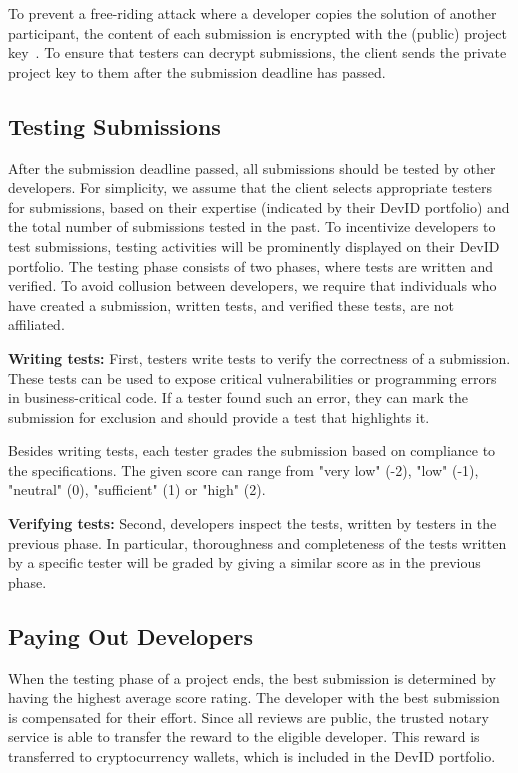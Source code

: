 To prevent a free-riding attack where a developer copies the solution of another participant, the content of each submission is encrypted with the (public) project key~\cite{zhang2015keep}.
To ensure that testers can decrypt submissions, the client sends the private project key to them after the submission deadline has passed.

\subsection{Testing Submissions}
\label{subsec:review_submissions}
After the submission deadline passed, all submissions should be tested by other developers.
For simplicity, we assume that the client selects appropriate testers for submissions, based on their expertise (indicated by their DevID portfolio) and the total number of submissions tested in the past.
To incentivize developers to test submissions, testing activities will be prominently displayed on their DevID portfolio.
The testing phase consists of two phases, where tests are written and verified.
To avoid collusion between developers, we require that individuals who have created a submission, written tests, and verified these tests, are not affiliated.

\textbf{Writing tests:}
First, testers write tests to verify the correctness of a submission.
These tests can be used to expose critical vulnerabilities or programming errors in business-critical code.
If a tester found such an error, they can mark the submission for exclusion and should provide a test that highlights it.

Besides writing tests, each tester grades the submission based on compliance to the specifications.
The given score can range from "very low" (-2), "low" (-1), "neutral" (0), "sufficient" (1) or "high" (2).

\textbf{Verifying tests:}
Second, developers inspect the tests, written by testers in the previous phase.
In particular, thoroughness and completeness of the tests written by a specific tester will be graded by giving a similar score as in the previous phase.

\subsection{Paying Out Developers}
\label{subsec:dappcoder_payout}
When the testing phase of a project ends, the best submission is determined by having the highest average score rating.
The developer with the best submission is compensated for their effort.
Since all reviews are public, the trusted notary service is able to transfer the reward to the eligible developer.
This reward is transferred to cryptocurrency wallets, which is included in the DevID portfolio.

